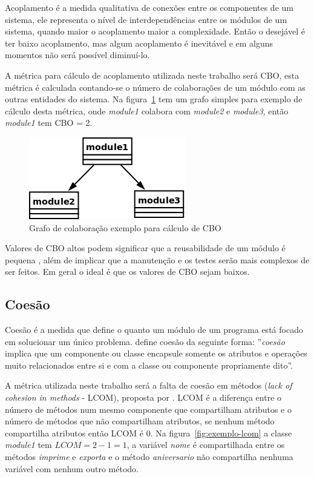Acoplamento é a medida qualitativa de conexões entre os componentes de um
sistema, ele representa o nível de interdependências entre os módulos de um
sistema, quando maior o acoplamento maior a complexidade. Então o desejável é
ter baixo acoplamento, mas algum acoplamento é inevitável e em alguns momentos
não será possível diminuí-lo.

A métrica para cálculo de acoplamento utilizada neste trabalho será CBO, esta
métrica é calculada contando-se o número de colaborações de um módulo com as
outras entidades do sistema. Na figura~\ref{fig:exemplo-cbo} tem um grafo
simples para exemplo de cálculo desta métrica, onde {\it module1} colabora com
{\it module2} e {\it module3}, então {\it module1} tem CBO = 2.

\begin{figure}[h]
\center
\includegraphics[scale=0.4]{imagens/exemplo-cbo}
\caption{Grafo de colaboração exemplo para cálculo de CBO}
\label{fig:exemplo-cbo}
\end{figure}

Valores de CBO altos podem significar que a reusabilidade de um módulo é
pequena \cite{engenhariaDeSoftwarePressman}, além de implicar que a manutenção
e os testes serão mais complexos de ser feitos. Em geral o ideal é que os
valores de CBO sejam baixos.

\subsection{Coesão}

Coesão é a medida que define o quanto um módulo de um programa está focado em
solucionar um único problema.  define
coesão da seguinte forma: ''{\it coesão} implica que um componente ou classe
encapsule somente os atributos e operações muito relacionados entre si e com a
classe ou componente propriamente dito''.

A métrica utilizada neste trabalho será a falta de coesão em métodos ({\it lack
of cohesion in methods} - LCOM), proposta por .
LCOM é a diferença entre o número de métodos num mesmo componente que
compartilham atributos e o número de métodos que não compartilham
atributos, se nenhum método compartilha atributos então LCOM é 0. Na
figura~\ref{fig:exemplo-lcom} a classe {\it module1} tem $LCOM = 2 - 1 = 1$, a
variável {\it nome} é compartilhada entre os métodos {\it imprime} e {\it
exporta} e o método {\it aniversario} não compartilha nenhuma variável com
nenhum outro método.

